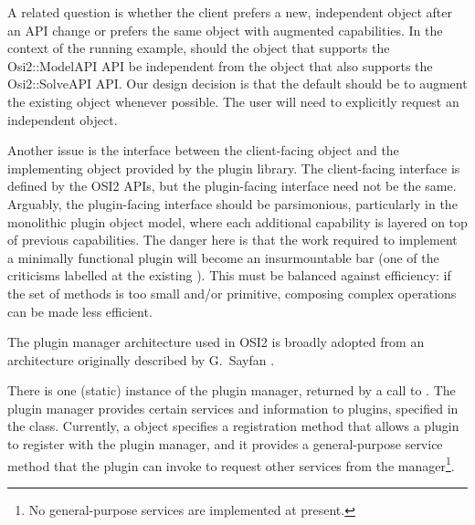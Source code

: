 \documentclass{article}
\newcommand{\OsiTwo}{OSI2\xspace}
\newcommand{\OsiTwoModel}{Osi2::ModelAPI\xspace}
\newcommand{\OsiTwoSolve}{Osi2::SolveAPI\xspace}
\begin{document}
A related question is whether the client prefers a new, independent object
after an API change or prefers the same object with augmented capabilities.
In the context of the running example, should the object that supports the
\OsiTwoModel API be independent from the object that also supports the
\OsiTwoSolve API\@.
Our design decision is that the default should be to augment the existing
object whenever possible.
The user will need to explicitly request an independent object.

Another issue is the interface between the client-facing object and the
implementing object provided by the plugin library.
The client-facing interface is defined by the \OsiTwo APIs, but the
plugin-facing interface need not be the same.
Arguably, the plugin-facing interface should be parsimonious, particularly in
the monolithic plugin object model, where each additional capability is
layered on top of previous capabilities.
The danger here is that the work required to implement a minimally functional
plugin will become an insurmountable bar (one of the criticisms labelled at
the existing ).
This must be balanced against efficiency: if the set of methods is too small
and/or primitive, composing complex operations can be made less efficient.



The plugin manager architecture used in \OsiTwo is broadly adopted from an
architecture originally described by G.~Sayfan \cite{say07}.

There is one (static) instance of the plugin manager, returned by a call to
.
The plugin manager provides certain services and information to plugins,
specified in the  class.
Currently, a  object specifies a registration
method that allows a plugin to register with the plugin manager, and it
provides a general-purpose service method that the plugin can invoke
to request other
services from the manager\footnote{%
  No general-purpose services are implemented at present.}.
\end{document}
